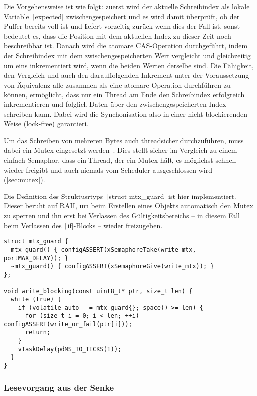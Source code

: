 Die Vorgehensweise ist wie folgt: zuerst wird der aktuelle Schreibindex als
lokale Variable \texttt|expected| zwischengespeichert und es wird damit
überprüft, ob der Puffer bereits voll ist und liefert vorzeitig zurück wenn dies
der Fall ist, sonst bedeutet es, dass die Position mit dem aktuellen Index zu
dieser Zeit noch beschreibbar ist. Danach wird die atomare CAS-Operation
durchgeführt, indem der Schreibindex mit dem zwischengespeicherten Wert
vergleicht und gleichzeitig um eins inkrementiert wird, wenn die beiden Werten
derselbe sind. Die Fähigkeit, den Vergleich und auch den darauffolgenden
Inkrement unter der Voraussetzung von Äquivalenz alle zusammen als eine atomare
Operation durchführen zu können, ermöglicht, dass nur ein Thread am Ende den
Schreibindex erfolgreich inkrementieren und folglich Daten über den
zwischengespeicherten Index schreiben kann. Dabei wird die Synchonisation also
in einer nicht-blockierenden Weise (lock-free) garantiert.

Um das Schreiben von mehreren Bytes auch threadsicher durchzuführen, muss dabei
ein Mutex eingesetzt werden~\cite{FreeRTOSForumPrintf}. Dies stellt sicher im
Vergleich zu einem einfach Semaphor, dass ein Thread, der ein Mutex hält, es
möglichst schnell wieder freigibt und auch niemals vom Scheduler ausgeschlossen
wird (\ref{sec:mutex}).

Die Definition des Struktuertyps \texttt|struct mtx_guard| ist hier
implementiert. Dieser beruht auf \ac{RAII}, um beim Erstellen eines Objekts
automatisch den Mutex zu sperren und ihn erst bei Verlassen des
Gültigkeitsbereichs – in diesem Fall beim Verlassen des
\texttt|if|-Blocks – wieder freizugeben.

\begin{code}
\begin{verbatim}
struct mtx_guard {
  mtx_guard() { configASSERT(xSemaphoreTake(write_mtx, portMAX_DELAY)); }
  ~mtx_guard() { configASSERT(xSemaphoreGive(write_mtx)); }
};

void write_blocking(const uint8_t* ptr, size_t len) {
  while (true) {
    if (volatile auto _ = mtx_guard{}; space() >= len) {
      for (size_t i = 0; i < len; ++i) configASSERT(write_or_fail(ptr[i]));
      return;
    }
    vTaskDelay(pdMS_TO_TICKS(1));
  }
}
\end{verbatim}
\end{code}

\subsubsection{Lesevorgang aus der Senke}

